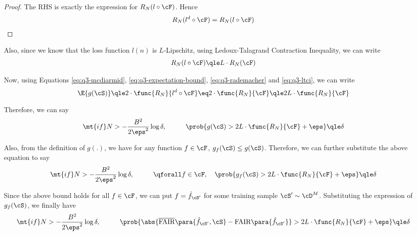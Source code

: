 \documentclass[a4paper,10pt]{article}
\begin{document}
\begin{question}
\begin{claim}
\begin{proof}
			The RHS is exactly the expression for $R_N(l \circ \cF)$. Hence
			\begin{equation}
				R_N(l^d \circ \cF) = R_N(l \circ \cF)
				\label{eq:q3-rademacher}
			\end{equation}

		\end{proof}
	\end{claim}

	Also, since we know that the loss function $l(n)$ is $L$-Lipschitz, using Ledoux-Talagrand Contraction Inequality, we can write
	\begin{equation}
		R_N(l \circ \cF)	\qle	L \cdot R_N(\cF)
		\label{eq:q3-ltci}
	\end{equation}

	Now, using Equations \ref{eq:q3-mcdiarmid}, \ref{eq:q3-expectation-bound}, \ref{eq:q3-rademacher} and \ref{eq:q3-ltci}, we can write
	\begin{align*}
		\E{g(\cS)}	\qle	2 \cdot \func{R_N}{l^d \circ \cF}	\eq	2 \cdot \func{R_N}{\cF}	\qle	2L \cdot \func{R_N}{\cF}
	\end{align*}

	Therefore, we can say
	\begin{align*}
		\mt{if} N > - \frac{B^2}{2 \eps^2} \log{\delta}, \hspace{1cm} \prob{g(\cS) > 2L \cdot \func{R_N}{\cF} + \eps}	\qle	\delta
	\end{align*}

	Also, from the definition of $g(.)$, we have for any function $f \in \cF$, $g_f(\cS) \le g(\cS)$. Therefore, we can further substitute the above equation to say
	\begin{equation}
		\mt{if} N > - \frac{B^2}{2 \eps^2} \log{\delta}, \hspace{1cm} \qforall f \in \cF, \quad \prob{g_f(\cS) > 2L \cdot \func{R_N}{\cF} + \eps}	\qle	\delta
	\end{equation}

	Since the above bound holds for all $f \in \cF$, we can put $f = \hat{f}_{\cS'}$ for some training sample $\cS' \sim \cD^M$. Substituting the expression of $g_f(\cS)$, we finally have
	\begin{align*}
		\mt{if} N > - \frac{B^2}{2 \eps^2} \log{\delta}, \hspace{1cm} \prob{\abs{\overline{\text{FAIR}}\para{\hat{f}_{\cS'}, \cS} - \text{FAIR}\para{\hat{f}_{\cS'}}} > 2L \cdot \func{R_N}{\cF} + \eps}	\qle	\delta
	\end{align*}


\end{question}
\end{document}
